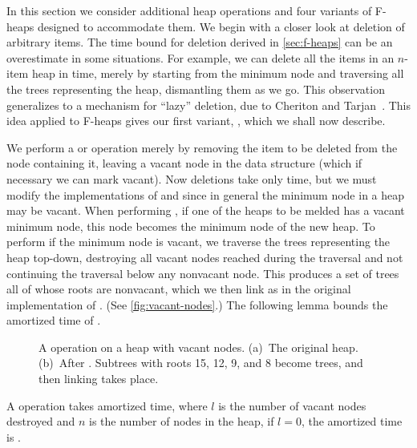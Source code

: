 In this section we consider additional heap operations and four variants of F-heaps
designed to accommodate them. We begin with a closer look at deletion of arbitrary
items. The  time bound for deletion derived in \autoref{sec:f-heaps} can
be an overestimate in some situations. For example, we can delete all the items in an
\(n\)-item heap in  time, merely by starting from the minimum node and
traversing all the trees representing the heap, dismantling them as we go. This
observation generalizes to a mechanism for ``lazy'' deletion, due to Cheriton and
Tarjan~\cite{CheritonTarjan1976}. This idea applied to F-heaps gives our first
variant, , which we shall now describe.

We perform a  or  operation merely by removing the item
to be deleted from the node containing it, leaving a vacant node in the data
structure (which if necessary we can mark vacant). Now deletions take only 
time, but we must modify the implementations of  and  since
in general the minimum node in a heap may be vacant. When performing , if
one of the heaps to be melded has a vacant minimum node, this node becomes the
minimum node of the new heap. To perform  if the minimum node is
vacant, we traverse the trees representing the heap top-down, destroying all vacant
nodes reached during the traversal and not continuing the traversal below any
nonvacant node. This produces a set of trees all of whose roots are nonvacant, which
we then link as in the original implementation of . (See
\autoref{fig:vacant-nodes}.) The following lemma bounds the amortized time of
.

\begin{figure}
	\caption{A  operation on a heap with vacant nodes. (a)~The original
	heap. (b)~After . Subtrees with roots 15, 12, 9, and 8 become
	trees, and then linking takes place.}
    \label{fig:vacant-nodes}
\end{figure}

\begin{lemma}
	A  operation takes  amortized time, where
	\(l\) is the number of vacant nodes destroyed and \(n\) is the number of nodes in
	the heap, if \(l = 0\), the amortized time is .
\end{lemma}

